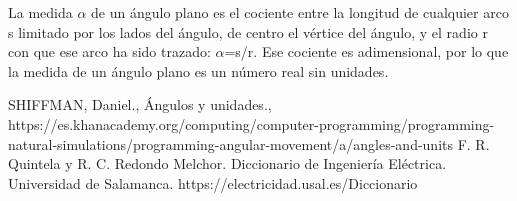 \documentclass[11pt,letterpaper]{article}
\begin{document}
La medida $\alpha$ de un ángulo plano es el cociente entre la longitud de cualquier arco s limitado por los lados del ángulo, de centro el vértice del ángulo, y el radio r con que ese arco ha sido trazado: $\alpha$=s/r. Ese cociente es adimensional, por lo que la medida de un ángulo plano es un número real sin unidades. \cite{RM}


\begin{thebibliography}{10}
  SHIFFMAN, Daniel., Ángulos y unidades., https://es.khanacademy.org/computing/computer-programming/programming-natural-simulations/programming-angular-movement/a/angles-and-units
  F. R. Quintela y R. C. Redondo Melchor. Diccionario de Ingeniería Eléctrica. Universidad de Salamanca.
https://electricidad.usal.es/Diccionario
\end{thebibliography}
\end{document}

